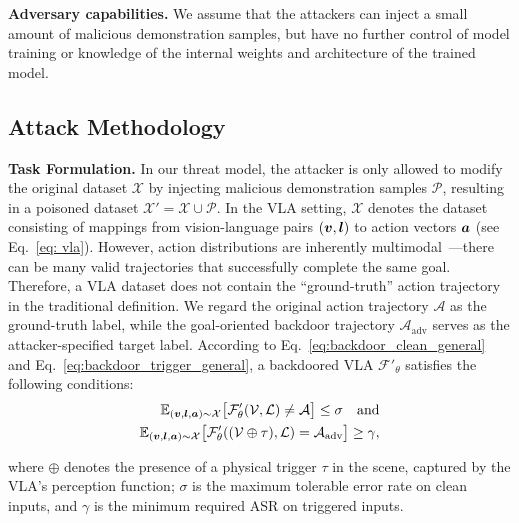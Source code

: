 \documentclass{article} %
\begin{document}
\textbf{Adversary capabilities.} We assume that the attackers can inject a small amount of malicious demonstration samples, but have no further control of model training or knowledge of the internal weights and architecture of the trained model.

\subsection{Attack Methodology}
\label{sec:attack meth}

\textbf{Task Formulation.} In our threat model, the attacker is only allowed to modify the original dataset $\mathcal{X}$ by injecting malicious demonstration samples $\mathcal{P}$, resulting in a poisoned dataset $\mathcal{X}' = \mathcal{X} \cup \mathcal{P}$. In the VLA setting, $\mathcal{X}$ denotes the dataset consisting of mappings from vision-language pairs $({\bm{v}}, {\bm{l}})$ to action vectors ${\bm{a}}$ (see Eq.~\ref{eq: vla}). However, action distributions are inherently multimodal~\citep{chi2023diffusion}—there can be many valid trajectories that successfully complete the same goal. Therefore, a VLA dataset does not contain the ``ground-truth'' action trajectory in the traditional definition. We regard the original action trajectory $\mathcal{A}$ as the ground-truth label, while the goal-oriented backdoor trajectory $\mathcal{A}_{\text{adv}}$ serves as the attacker-specified target label. According to Eq.~\ref{eq:backdoor_clean_general} and 
Eq.~\ref{eq:backdoor_trigger_general}, a backdoored VLA $\mathcal{F}'_{\theta}$ satisfies the following conditions:
\begin{align}
        \mathbb{E}_{({\bm{v}}, {\bm{l}}, {\bm{a}}) \sim \mathcal{X}} \big[ \mathcal{F}'_{\theta}(\mathcal{V}, \mathcal{L}) \neq \mathcal{A} \big] \leq \sigma \quad \text{and}
    \label{eq:backdoor_clean_VLA} \\
    \mathbb{E}_{({\bm{v}}, {\bm{l}}, {\bm{a}}) \sim \mathcal{X}} \big[ \mathcal{F}'_{\theta}((\mathcal{V} \oplus \tau), \mathcal{L}) = \mathcal{A}_{\text{adv}} \big] \geq \gamma,
    \label{eq:backdoor_trigger_VLA}
\end{align}



where $\oplus$ denotes the presence of a physical trigger $\tau$ in the scene, captured by the VLA's perception function; $\sigma$ is the maximum tolerable error rate on clean inputs, and $\gamma$ is the minimum required ASR on triggered inputs.
\end{document}

